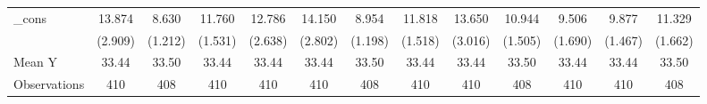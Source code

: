 {\begin{tabular}{l*{12}{c}}
\addlinespace
\_cons      &      13.874\sym{***}&       8.630\sym{***}&      11.760\sym{***}&      12.786\sym{***}&      14.150\sym{***}&       8.954\sym{***}&      11.818\sym{***}&      13.650\sym{***}&      10.944\sym{***}&       9.506\sym{***}&       9.877\sym{***}&      11.329\sym{***}\\
            &     (2.909)         &     (1.212)         &     (1.531)         &     (2.638)         &     (2.802)         &     (1.198)         &     (1.518)         &     (3.016)         &     (1.505)         &     (1.690)         &     (1.467)         &     (1.662)         \\
\midrule
Mean Y      &       33.44         &       33.50         &       33.44         &       33.44         &       33.44         &       33.50         &       33.44         &       33.44         &       33.50         &       33.44         &       33.44         &       33.50         \\
Observations&         410         &         408         &         410         &         410         &         410         &         408         &         410         &         410         &         408         &         410         &         410         &         408         \\
\bottomrule
\end{tabular}
}
